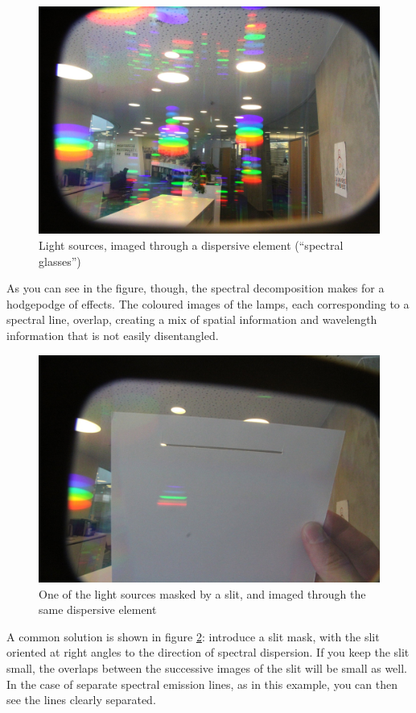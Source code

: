 \documentclass[twocolumn,apj]{openjournal}
\begin{document}
\begin{figure}[htbp]
\begin{center}
\includegraphics[width=\linewidth]{fIMG_6186.jpg}
\caption{Light sources, imaged through a dispersive element (``spectral glasses'')}
\label{SpectraDispersive}
\end{center}
\end{figure}
As you can see in the figure, though, the spectral decomposition makes for a hodgepodge of effects. The coloured images of the lamps, each corresponding to a spectral line, overlap, creating a mix of spatial information and wavelength information that is not easily disentangled.
\begin{figure}[htbp]
\begin{center}
\includegraphics[width=\linewidth]{fIMG_6187.jpg}
\caption{One of the light sources masked by a slit, and imaged through the same dispersive element}
\label{SpectraSlit}
\end{center}
\end{figure}
A common solution is shown in figure \ref{SpectraSlit}: introduce a slit mask, with the slit oriented at right angles to the direction of spectral dispersion. If you keep the slit small, the overlaps between the successive images of the slit will be small as well. In the case of separate spectral emission lines, as in this example, you can then see the lines clearly separated. 
\end{document}
